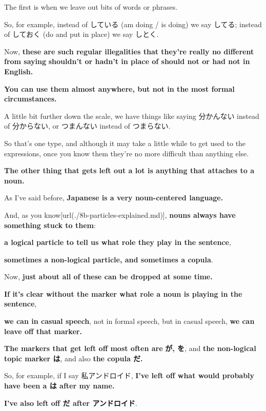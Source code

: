 The first is when we leave out bits of words or phrases.

{}

So, for example, instead of している (am doing / is doing) we say してる; instead of しておく (do and put in place) we say しとく.

Now, {\bf these are such regular illegalities that they're really no different from saying} {\bf shouldn't or hadn't in place of should not or had not in English.}

{\bf You can use them almost anywhere, but not in the most formal circumstances.}

A little bit further down the scale, we have things like saying 分かんない instead of 分からない, or つまんない instead of つまらない.

So that's one type, and although it may take a little while to get used to the expressions, once you know them they're no more difficult than anything else.

\thinrule

{\bf The other thing that gets left out a lot is anything that attaches to a noun.}

{}

As I've said before, {\bf Japanese is a very noun-centered language.}

And, as you know\goto{{[}8b{]}}[url(./8b-particles-explained.md)], {\bf nouns always have something stuck to them}:

{\bf a logical particle to tell us what role they play in the sentence},

{\bf sometimes a non-logical particle, and sometimes a copula}.

Now, {\bf just about all of these can be dropped at some time.}

{\bf If it's clear without the marker what role a noun is playing in the sentence},

{\bf we can in casual speech}, not in formal speech, but in casual speech, {\bf we can leave off that marker.}

\thinrule

{\bf The markers that get left off most often are} {\bf が, を}, and {\bf the non-logical topic marker は}, and also {\bf the copula だ.}

So, for example, if I say 私アンドロイド, {\bf I've left off what would probably have been a は after my name.}

{\bf I've also left off だ after アンドロイド}.

